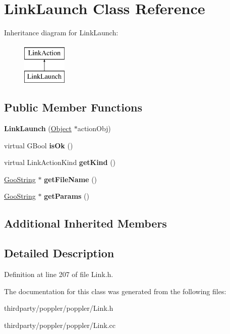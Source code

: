 \hypertarget{class_link_launch}{}\section{Link\+Launch Class Reference}
\label{class_link_launch}
Inheritance diagram for Link\+Launch\+:\begin{figure}[H]
\begin{center}
\leavevmode
\includegraphics[height=2.000000cm]{class_link_launch}
\end{center}
\end{figure}
\subsection*{Public Member Functions}
\begin{DoxyCompactItemize}
\item 
\mbox{\label{class_link_launch_a4f4b682f22bb5725ca78d1813de5b1c2}} 
{\bfseries Link\+Launch} (\hyperlink{class_object}{Object} $\ast$action\+Obj)
\item 
\mbox{\label{class_link_launch_aa7d7ffc13a0890bb771b80c192683122}} 
virtual G\+Bool {\bfseries is\+Ok} ()
\item 
\mbox{\label{class_link_launch_a4d76081fd373638fc8f755487d33876b}} 
virtual Link\+Action\+Kind {\bfseries get\+Kind} ()
\item 
\mbox{\label{class_link_launch_a71d7c8ae0cea927e7b4c0ce68c11589b}} 
\hyperlink{class_goo_string}{Goo\+String} $\ast$ {\bfseries get\+File\+Name} ()
\item 
\mbox{\label{class_link_launch_a04385f18dd71deb08052c5f66ee6471b}} 
\hyperlink{class_goo_string}{Goo\+String} $\ast$ {\bfseries get\+Params} ()
\end{DoxyCompactItemize}
\subsection*{Additional Inherited Members}


\subsection{Detailed Description}


Definition at line 207 of file Link.\+h.



The documentation for this class was generated from the following files\+:\begin{DoxyCompactItemize}
\item 
thirdparty/poppler/poppler/Link.\+h\item 
thirdparty/poppler/poppler/Link.\+cc\end{DoxyCompactItemize}
